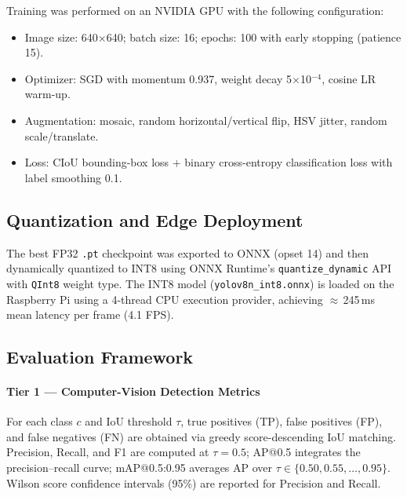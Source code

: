 \documentclass[10pt,conference]{IEEEtran}
\begin{document}
Training was performed on an NVIDIA GPU with the following configuration:
\begin{itemize}
  \item Image size: 640$\times$640; batch size: 16; epochs: 100 with early stopping (patience 15).
  \item Optimizer: SGD with momentum 0.937, weight decay 5$\times$10$^{-4}$, cosine LR warm-up.
  \item Augmentation: mosaic, random horizontal/vertical flip, HSV jitter, random scale/translate.
  \item Loss: CIoU bounding-box loss + binary cross-entropy classification loss with label smoothing 0.1.
\end{itemize}

\subsection{Quantization and Edge Deployment}
The best FP32 \texttt{.pt} checkpoint was exported to ONNX (opset 14) and then dynamically quantized to INT8 using ONNX Runtime's \texttt{quantize\_dynamic} API with \texttt{QInt8} weight type. The INT8 model (\texttt{yolov8n\_int8.onnx}) is loaded on the Raspberry Pi using a 4-thread CPU execution provider, achieving $\approx$\,245\,ms mean latency per frame (4.1 FPS).

\subsection{Evaluation Framework}
\paragraph{Tier 1 — Computer-Vision Detection Metrics}
For each class $c$ and IoU threshold $\tau$, true positives (TP), false positives (FP), and false negatives (FN) are obtained via greedy score-descending IoU matching. Precision, Recall, and F1 are computed at $\tau = 0.5$; AP@0.5 integrates the precision–recall curve; mAP@0.5:0.95 averages AP over $\tau \in \{0.50, 0.55, \ldots, 0.95\}$. Wilson score confidence intervals (95\%) are reported for Precision and Recall.
\end{document}
